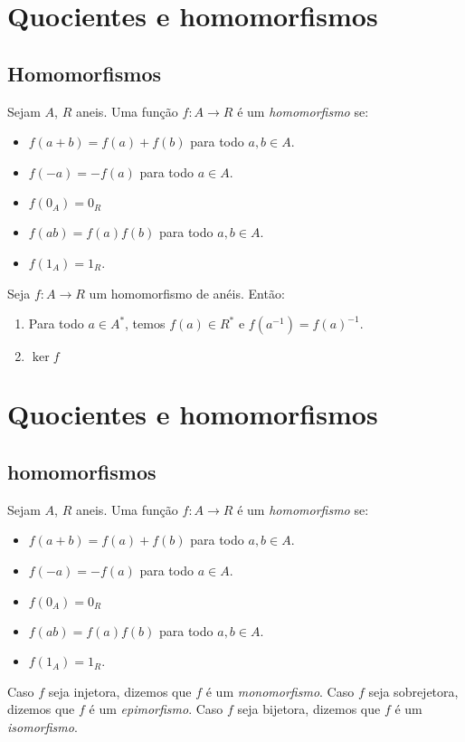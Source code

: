 \section{Quocientes e homomorfismos}
\subsection{Homomorfismos}
\begin{definition}
Sejam $A$, $R$ aneis. Uma função $f:A\rightarrow R$ é um \emph{homomorfismo} se:
\begin{itemize}
    \item $f(a+b)=f(a)+f(b)$ para todo $a, b \in A$.
    \item $f(-a)=-f(a)$ para todo $a \in A$.
    \item $f(0_A)=0_R$
    \item $f(ab)=f(a)f(b)$ para todo $a, b \in A$.
    \item $f(1_A)=1_R$.
\end{itemize}
\end{definition}

\begin{prop}
    Seja $f:A\rightarrow R$ um homomorfismo de anéis. Então:
    \begin{enumerate}[label=\alph*)]
        \item Para todo $a \in A^*$, temos $f(a) \in R^*$ e $f(a^{-1})=f(a)^{-1}$.
        \item $\ker f$
    \end{enumerate}
\end{prop}

\section{Quocientes e homomorfismos}
\subsection{homomorfismos}
\begin{definition}
Sejam $A$, $R$ aneis. Uma função $f:A\rightarrow R$ é um \emph{homomorfismo} se:
\begin{itemize}
    \item $f(a+b)=f(a)+f(b)$ para todo $a, b \in A$.
    \item $f(-a)=-f(a)$ para todo $a \in A$.
    \item $f(0_A)=0_R$
    \item $f(ab)=f(a)f(b)$ para todo $a, b \in A$.
    \item $f(1_A)=1_R$.
\end{itemize}

Caso $f$ seja injetora, dizemos que $f$ é um \emph{monomorfismo}. Caso $f$ seja sobrejetora, dizemos que $f$ é um \emph{epimorfismo}. Caso $f$ seja bijetora, dizemos que $f$ é um \emph{isomorfismo}.
\end{definition}

